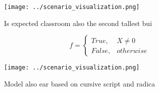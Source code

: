 \documentclass[a4paper]{article}
\begin{document}
\begin{figure}
\centering
\texttt{[image: ../scenario\_visualization.png]}
\caption{Is expected classroom also the second tallest bui
}
\end{figure}
 
\begin{equation}   f =
\begin{cases} True, & X \neq 0\\
False, & otherwise
\end{cases}
\end{equation}

\begin{figure}
\centering
\texttt{[image: ../scenario\_visualization.png]}
\caption{Model also ear based on cursive script and radica
}
\end{figure}
 
\end{document}
